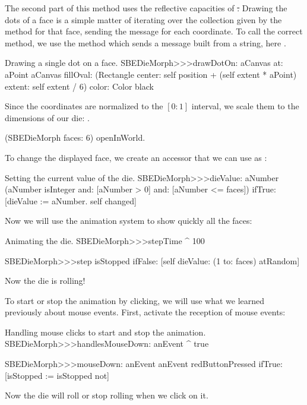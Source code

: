 \documentclass[a4paper,10pt,twoside]{book}
\begin{document}
The second part of this method uses the reflective capacities of \st.
Drawing the dots of a face is a simple matter of iterating over the collection given by the  method for that face, sending the  message for each coordinate.
To call the correct  method, we use the  method which sends a message built from a string, here .

\begin{method}{Drawing a single dot on a face.}
SBEDieMorph>>>drawDotOn: aCanvas at: aPoint
	aCanvas
		fillOval: (Rectangle
			center: self position + (self extent * aPoint)
			extent: self extent / 6)
		color: Color black
\end{method}

Since the coordinates are normalized to the $[0{:}1]$ interval, we scale them to the dimensions of our die: .

\begin{code}{}
(SBEDieMorph faces: 6) openInWorld.
\end{code}

To change the displayed face, we create an accessor that we can use as :
\begin{method}{Setting the current value of the die.}
SBEDieMorph>>>dieValue: aNumber
	(aNumber isInteger
			and: [aNumber > 0]
			and: [aNumber <= faces])
		ifTrue:
			[dieValue := aNumber.
			self changed]
\end{method}

Now we will use the animation system to show quickly all the faces:
\begin{methods}{Animating the die.}
SBEDieMorph>>>stepTime
	^ 100

SBEDieMorph>>>step
	isStopped ifFalse: [self dieValue: (1 to: faces) atRandom]
\end{methods}
Now the die is rolling!

To start or stop the animation by clicking, we will use what we learned previously about mouse events.
First, activate the reception of mouse events:

\begin{methods}{Handling mouse clicks to start and stop the animation.}
SBEDieMorph>>>handlesMouseDown: anEvent
	^ true

SBEDieMorph>>>mouseDown: anEvent
	anEvent redButtonPressed
		ifTrue: [isStopped := isStopped not]
\end{methods}
Now the die will roll or stop rolling when we click on it.
\end{document}
